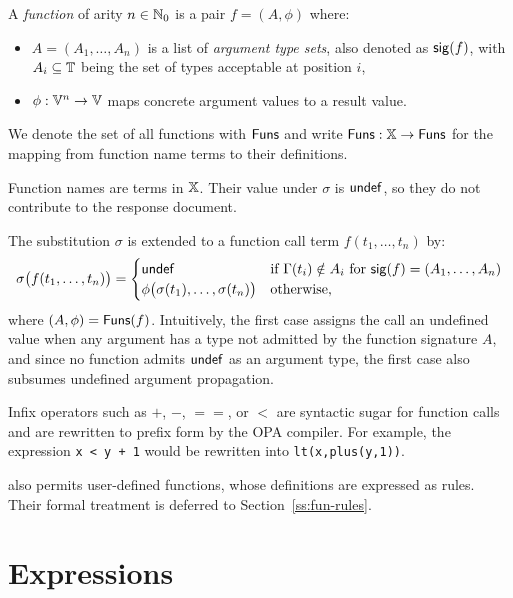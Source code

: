 
A \emph{function} of arity $n \in \mathbb{N}_0$ is a pair $f = (A, \phi)$ where:
\begin{itemize}
  \item $A = (A_1, \ldots, A_n)$ is a list of \emph{argument type sets}, also denoted as $\mathsf{sig}(f)$, with $A_i \subseteq \mathbb{T}$ being the set of types acceptable at position $i$,
  \item $\phi : \mathbb{V}^n \to \mathbb{V}$ maps concrete argument values to a result value.
\end{itemize}
We denote the set of all functions with $\mathsf{Funs}$ and write $\mathsf{Funs} : \mathbb{X} \to \mathsf{Funs}$ for the mapping from function name terms to their definitions.

Function names are terms in $\mathbb{X}$.
Their value under $\sigma$ is $\mathsf{undef}$, so they do not contribute to the response document.

The substitution $\sigma$ is extended to a function call term $f(t_1, \ldots, t_n)$ by:
\[
\sigma\bigl(f(t_1,\ldots,t_n)\bigr) =
\begin{cases}
  \mathsf{undef} & \text{if } \Gamma(t_i) \notin A_i \text{ for } \mathsf{sig}(f) = (A_1,\ldots,A_n) \\
  \phi\bigl(\sigma(t_1),\ldots,\sigma(t_n)\bigr) & \text{otherwise,}
\end{cases}
\]
where $(A, \phi) = \mathsf{Funs}(f)$.
Intuitively, the first case assigns the call an undefined value when any argument has a type not admitted by the function signature $A$, and since no function admits $\mathsf{undef}$ as an argument type, the first case also subsumes undefined argument propagation.

Infix operators such as $+$, $-$, $==$, or $<$ are syntactic sugar for function calls and are rewritten to prefix form by the OPA compiler.
For example, the expression \texttt{x < y + 1} would be rewritten into \texttt{lt(x,plus(y,1))}.

\rego also permits user-defined functions, whose definitions are expressed as rules.
Their formal treatment is deferred to Section~\ref{ss:fun-rules}.

\section{Expressions}
\label{s:exprs}

